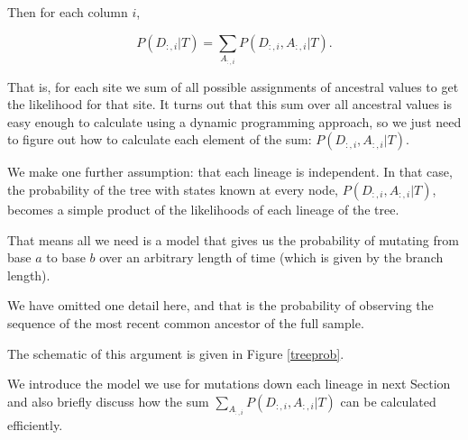 \documentclass[11pt]{article}
\begin{document}
Then for each column $i$,

 \[ P(D_{:,i}|T) = \sum_{A_{:,i}} P(D_{:,i}, A_{:,i} |T).  \]
 
 That is, for each site we sum of all possible assignments of ancestral values to get the likelihood for that site.  It turns out that this sum over all ancestral values is easy enough to calculate using a dynamic programming approach, so we just need to figure out how to calculate each element of the sum: $P(D_{:,i}, A_{:,i} |T)$.
 
We make one further assumption: that each lineage is independent.  In that case, the probability of the tree with  states known at every node,  $P(D_{:,i}, A_{:,i} |T)$, becomes a simple product of the likelihoods of each lineage of the tree.  

That means all we need is a model that gives us the probability of mutating from base $a$ to base $b$ over an arbitrary length of time (which is given by the branch length).

We have omitted one detail here, and that is the probability of observing the sequence of the most recent common ancestor of the full sample.  


The schematic of this argument is given in Figure \ref{treeprob}.

We introduce the model we use for mutations down each lineage in next Section and also briefly discuss how the sum $ \sum_{A_{:,i}} P(D_{:,i}, A_{:,i} |T)$ can be calculated efficiently.  
\end{document}
